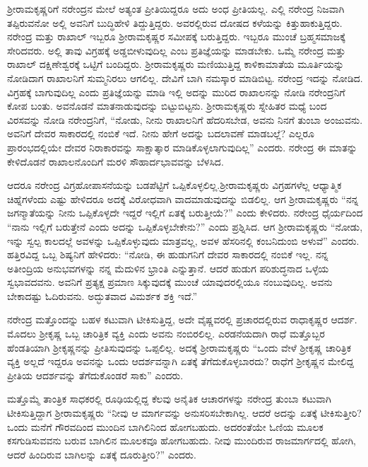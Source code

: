 ಶ‍್ರೀರಾಮಕೃಷ್ಣರಿಗೆ ನರೇಂದ್ರನ ಮೇಲೆ ಅತ್ಯಂತ ಪ್ರೀತಿಯಿದ್ದರೂ ಅದು ಅಂಧ ಪ್ರೀತಿಯಲ್ಲ. ಎಲ್ಲಿ ನರೇಂದ್ರ ನಿಜವಾಗಿ ತಪ್ಪಿರುವನೋ ಅಲ್ಲಿ ಅವನಿಗೆ ಬುದ್ಧಿಹೇಳಿ ತಿದ್ದುತ್ತಿದ್ದರು. ಅವರಲ್ಲಿರುವ ದೋಷದ ಕಳೆಯನ್ನು ಕಿತ್ತುಹಾಕುತ್ತಿದ್ದರು. ನರೇಂದ್ರ ಮತ್ತು ರಾಖಾಲ್ ಇಬ್ಬರೂ ಶ‍್ರೀರಾಮಕೃಷ್ಣರ ಸಮೀಪಕ್ಕೆ ಬರುತ್ತಿದ್ದರು. ಇಬ್ಬರೂ ಮುಂಚೆ ಬ್ರಹ್ಮಸಮಾಜಕ್ಕೆ ಸೇರಿದವರು. ಅಲ್ಲಿ ತಾವು ವಿಗ್ರಹಕ್ಕೆ ಅಡ್ಡಬೀಳುವುದಿಲ್ಲ ಎಂಬ ಪ್ರತಿಜ್ಞೆಯನ್ನು ಮಾಡಬೇಕು. ಒಮ್ಮೆ ನರೇಂದ್ರ ಮತ್ತು ರಾಖಾಲ್ ದಕ್ಷಿಣೇಶ್ವರಕ್ಕೆ ಒಟ್ಟಿಗೆ ಬಂದಿದ್ದರು. ಶ‍್ರೀರಾಮಕೃಷ್ಣರು ಮಣಿಯುತ್ತಿದ್ದ ಕಾಳಿಕಾಮಾತೆಯ ಮೂರ್ತಿಯನ್ನು ನೋಡಿದಾಗ ರಾಖಾಲನಿಗೆ ಸುಮ್ಮನಿರಲು ಆಗಲಿಲ್ಲ. ದೇವಿಗೆ ಬಾಗಿ ನಮಸ್ಕಾರ ಮಾಡಿಬಿಟ್ಟ. ನರೇಂದ್ರ ಇದನ್ನು ನೋಡಿದ. ವಿಗ್ರಹಕ್ಕೆ ಬಾಗುವುದಿಲ್ಲ ಎಂದು ಪ್ರತಿಜ್ಞೆಯನ್ನು ಮಾಡಿ ಇಲ್ಲಿ ಅದನ್ನು ಮುರಿದ ರಾಖಾಲನನ್ನು ನೋಡಿ ನರೇಂದ್ರನಿಗೆ ಕೋಪ ಬಂತು. ಅವನೊಡನೆ ಮಾತನಾಡುವುದನ್ನು ಬಿಟ್ಟುಬಿಟ್ಟನು. ಶ‍್ರೀರಾಮಕೃಷ್ಣರು ಸ್ನೇಹಿತರ ಮಧ್ಯೆ ಬಂದ ವಿರಸವನ್ನು ನೋಡಿ ನರೇಂದ್ರನಿಗೆ, “ನೋಡು, ನೀನು ರಾಖಾಲನಿಗೆ ಹೆದರಿಸಬೇಡ, ಅವನು ನಿನಗೆ ತುಂಬಾ ಅಂಜುವನು. ಅವನಿಗೆ ದೇವರ ಸಾಕಾರದಲ್ಲಿ ನಂಬಿಕೆ ಇದೆ. ನೀನು ಹೇಗೆ ಅದನ್ನು ಬದಲಾವಣೆ ಮಾಡಬಲ್ಲೆ? ಎಲ್ಲರೂ ಪ್ರಾರಂಭದಲ್ಲಿಯೇ ದೇವರ ನಿರಾಕಾರವನ್ನು ಸಾಕ್ಷಾತ್ಕಾರ ಮಾಡಿಕೊಳ್ಳಲಾಗುವುದಿಲ್ಲ” ಎಂದರು. ನರೇಂದ್ರ ಈ ಮಾತನ್ನು ಕೇಳಿದೊಡನೆ ರಾಖಾಲನೊಂದಿಗೆ ಮರಳಿ ಸೌಹಾರ್ದಭಾವವನ್ನು ಬೆಳಸಿದ.

ಆದರೂ ನರೇಂದ್ರ ವಿಗ್ರಹೋಪಾಸನೆಯನ್ನು ಬಡಪೆಟ್ಟಿಗೆ ಒಪ್ಪಿಕೊಳ್ಳಲಿಲ್ಲ.\break ಶ‍್ರೀರಾಮಕೃಷ್ಣರು ವಿಗ್ರಹಗಳೆಲ್ಲ ಆಧ್ಯಾತ್ಮಿಕ ಚಿಹ್ನೆಗಳೆಂದು ಎಷ್ಟು ಹೇಳಿದರೂ ಅದಕ್ಕೆ ವಿರೋಧವಾಗಿ ವಾದಮಾಡುವುದನ್ನು ಬಿಡಲಿಲ್ಲ. ಆಗ ಶ‍್ರೀರಾಮಕೃಷ್ಣರು “ನನ್ನ ಜಗನ್ಮಾತೆಯನ್ನು ನೀನು ಒಪ್ಪಿಕೊಳ್ಳದೇ ಇದ್ದರೆ ಇಲ್ಲಿಗೆ ಏತಕ್ಕೆ ಬರುತ್ತೀಯೆ?” ಎಂದು ಕೇಳಿದರು. ನರೇಂದ್ರ ಧೈರ್ಯದಿಂದ “ನಾನು ಇಲ್ಲಿಗೆ ಬರುತ್ತೇನೆ ಎಂದು ಅದನ್ನು ಒಪ್ಪಿಕೊಳ್ಳಬೇಕೇನು?” ಎಂದು ಪ್ರಶ್ನಿಸಿದ. ಆಗ ಶ‍್ರೀರಾಮಕೃಷ್ಣರು “ನೋಡು, ಇನ್ನು ಸ್ವಲ್ಪ ಕಾಲದಲ್ಲೆ ಅವಳನ್ನು ಒಪ್ಪಿಕೊಳ್ಳುವುದು ಮಾತ್ರವಲ್ಲ, ಅವಳ ಹೆಸರಿನಲ್ಲಿ ಕಂಬನಿದುಂಬಿ ಅಳುವೆ” ಎಂದರು. ಹತ್ತಿರವಿದ್ದ ಒಬ್ಬ ಶಿಷ್ಯನಿಗೆ ಹೇಳಿದರು: “ನೋಡಿ, ಈ ಹುಡುಗನಿಗೆ ದೇವರ ಸಾಕಾರದಲ್ಲಿ ನಂಬಿಕೆ ಇಲ್ಲ. ನನ್ನ ಅತೀಂದ್ರಿಯ ಅನುಭವಗಳನ್ನು ನನ್ನ ಮೆದುಳಿನ ಭ್ರಾಂತಿ ಎನ್ನುತ್ತಾನೆ. ಆದರೆ ಹುಡುಗ ಪರಿಶುದ್ಧನಾದ ಒಳ್ಳೆಯ ಸ್ವಭಾವದವನು. ಅವನಿಗೆ ಪ್ರತ್ಯಕ್ಷ ಪ್ರಮಾಣ ಸಿಕ್ಕುವುದಕ್ಕೆ ಮುಂಚೆ ಯಾವುದರಲ್ಲಿಯೂ ನಂಬುವುದಿಲ್ಲ. ಅವನು ಬೇಕಾದಷ್ಟು ಓದಿರುವನು. ಅದ್ಭುತವಾದ ವಿಮರ್ಶಕ ಶಕ್ತಿ ಇದೆ.”

ನರೇಂದ್ರ ಮತ್ತೊಂದನ್ನು ಬಹಳ ಕಟುವಾಗಿ ಟೀಕಿಸುತ್ತಿದ್ದ, ಅದೇ ವೈಷ್ಣವರಲ್ಲಿ ಪ್ರಚಾರದಲ್ಲಿರುವ ರಾಧಾಕೃಷ್ಣರ ಆದರ್ಶ. ಮೊದಲು ಶ‍್ರೀಕೃಷ್ಣ ಒಬ್ಬ ಚಾರಿತ್ರಿಕ ವ್ಯಕ್ತಿ ಎಂದು ಅವನು ನಂಬಿರಲಿಲ್ಲ. ಎರಡನೆಯದಾಗಿ ರಾಧೆ ಮತ್ತೊಬ್ಬರ ಹೆಂಡತಿಯಾಗಿ ಶ‍್ರೀಕೃಷ್ಣನನ್ನು ಪ್ರೀತಿಸುವುದನ್ನು ಒಪ್ಪಲಿಲ್ಲ. ಅದಕ್ಕೆ ಶ‍್ರೀರಾಮಕೃಷ್ಣರು “ಒಂದು ವೇಳೆ ಶ‍್ರೀಕೃಷ್ಣ ಚಾರಿತ್ರಿಕ ವ್ಯಕ್ತಿ ಅಲ್ಲದೆ ಇದ್ದರೂ ಅವನನ್ನು ಒಂದು ಆದರ್ಶವನ್ನಾಗಿ ಏತಕ್ಕೆ ತೆಗೆದುಕೊಳ್ಳಬಾರದು? ರಾಧೆಗೆ ಶ‍್ರೀಕೃಷ್ಣನ ಮೇಲಿದ್ದ ಪ್ರೀತಿಯ ಆದರ್ಶವನ್ನು ತೆಗೆದುಕೊಂಡರೆ ಸಾಕು” ಎಂದರು.

ಮತ್ತೊಮ್ಮೆ ತಾಂತ್ರಿಕ ಸಾಧಕರಲ್ಲಿ ರೂಢಿಯಲ್ಲಿದ್ದ ಕೆಲವು ಅನೈತಿಕ ಆಚಾರಗಳನ್ನು ನರೇಂದ್ರ ತುಂಬಾ ಕಟುವಾಗಿ ಟೀಕಿಸುತ್ತಿದ್ದಾಗ ಶ‍್ರೀರಾಮಕೃಷ್ಣರು “ನೀವು ಆ ಮಾರ್ಗವನ್ನು ಅನುಸರಿಸಬೇಕಾಗಿಲ್ಲ. ಆದರೆ ಅದನ್ನು ಏತಕ್ಕೆ ಟೀಕಿಸುತ್ತೀರಿ? ಒಂದು ಮನೆಗೆ ಗೌರವದಿಂದ ಮುಂದಿನ ಬಾಗಿಲಿನಿಂದ ಹೋಗಬಹುದು. ಅದರಂತೆಯೇ ಓಣಿಯ ಮೂಲಕ ಕಸಗುಡಿಸುವವನು ಬರುವ ಬಾಗಿಲಿನ ಮೂಲಕವೂ ಹೋಗಬಹುದು. ನೀವು ಮುಂದಿರುವ ರಾಜಮಾರ್ಗದಲ್ಲಿ ಹೋಗಿ, ಆದರೆ ಹಿಂದಿರುವ ಬಾಗಿಲನ್ನು ಏತಕ್ಕೆ ದೂರುತ್ತೀರಿ?” ಎಂದರು.

